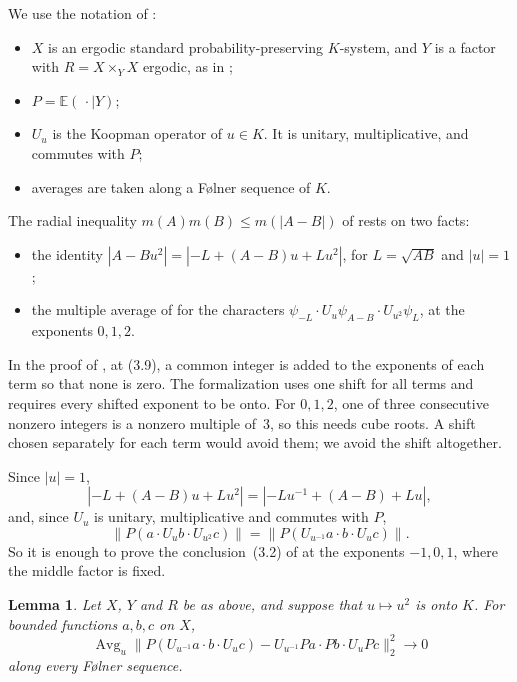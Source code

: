 \documentclass[11pt,a4paper]{amsart}
\newtheorem{lemma}[theorem]{Lemma}
\theoremstyle{remark}
\begin{document}
We use the notation of \cite[\S3]{OpenAI}:
\begin{itemize}
\item $X$ is an ergodic standard probability-preserving $K$-system, and $Y$ is a factor with $R=X\times_YX$ ergodic,
as in \cite[Lemma~3.2]{OpenAI};
\item $P=\mathbb{E}(\,\cdot\mid Y)$;
\item $U_u$ is the Koopman operator of $u\in K$. It is unitary, multiplicative, and commutes with $P$;
\item averages are taken along a F{\o}lner sequence of $K$.
\end{itemize}
The radial inequality $m(A)m(B)\le m(|A-B|)$ of \cite[Lemma~3.3]{OpenAI} rests on two facts:
\begin{itemize}
\item the identity $|A-Bu^2|=|-L+(A-B)u+Lu^2|$, for $L=\sqrt{AB}$ and $|u|=1$;
\item the multiple average of \cite[Lemma~3.2]{OpenAI} for the characters
$\psi_{-L}\cdot U_u\psi_{A-B}\cdot U_{u^2}\psi_L$, at the exponents $0,1,2$.
\end{itemize}
In the proof of \cite[Lemma~3.2]{OpenAI}, at (3.9), a common integer is added to the exponents of each term so that
none is zero. The formalization uses one shift for all terms and requires every shifted exponent to be onto. For
$0,1,2$, one of three consecutive nonzero integers is a nonzero multiple of~$3$, so this needs cube roots. A shift
chosen separately for each term would avoid them; we avoid the shift altogether.

Since $|u|=1$,
\[
|-L+(A-B)u+Lu^2|=|-Lu^{-1}+(A-B)+Lu|,
\]
and, since $U_u$ is unitary, multiplicative and commutes with $P$,
\[
\|P(a\cdot U_ub\cdot U_{u^2}c)\|=\|P(U_{u^{-1}}a\cdot b\cdot U_uc)\|.
\]
So it is enough to prove the conclusion~(3.2) of \cite[Lemma~3.2]{OpenAI} at the exponents $-1,0,1$, where the
middle factor is fixed.

\begin{lemma}\label{lem:triple}
Let $X$, $Y$ and $R$ be as above, and suppose that $u\mapsto u^2$ is onto $K$. For bounded functions $a,b,c$ on $X$,
\[
\operatorname{Avg}_u\bigl\|P(U_{u^{-1}}a\cdot b\cdot U_uc)-U_{u^{-1}}Pa\cdot Pb\cdot U_uPc\bigr\|_2^2\longrightarrow0
\]
along every F{\o}lner sequence.
\end{lemma}
\end{document}
